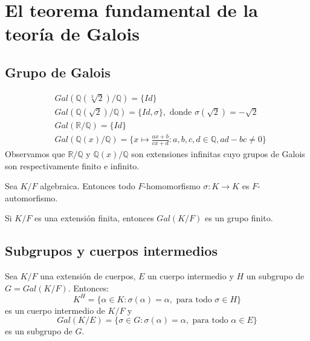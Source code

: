 \chapter{El teorema fundamental de la teoría de Galois}
\section{Grupo de Galois}

\begin{example}
    \begin{align*}
         & Gal(\mathbb{Q}(\sqrt[3]{2})/\mathbb{Q}) = \{Id\}                                                                \\
         & Gal(\mathbb{Q}(\sqrt{2})/\mathbb{Q}) = \{ Id, \sigma \}, \text{ donde } \sigma(\sqrt{2}) = -\sqrt{2}            \\
         & Gal(\mathbb{R}/\mathbb{Q}) = \{Id\}                                                                             \\
         & Gal(\mathbb{Q}(x)/\mathbb{Q}) = \{ x \mapsto \frac{ax + b}{cx + d} : a, b, c, d \in \mathbb{Q}, ad-bc \neq 0 \}
    \end{align*}
    Observamos que $\mathbb{R}/\mathbb{Q}$ y $\mathbb{Q}(x)/\mathbb{Q}$ son extensiones infinitas cuyo grupos de Galois son respectivamente finito e infinito.
\end{example}

\begin{lemma}
    Sea $K/F$ algebraica. Entonces todo $F$-homomorfismo $\sigma : K \to K$ es $F$-automorfismo.
\end{lemma}

\begin{theorem}
    Si $K/F$ es una extensión finita, entonces $Gal(K/F)$ es un grupo finito.
\end{theorem}

\section{Subgrupos y cuerpos intermedios}

\begin{theorem}
    Sea $K/F$ una extensión de cuerpos, $E$ un cuerpo intermedio y $H$ un subgrupo de $G = Gal(K/F)$. Entonces:
    $$K^H = \{ \alpha \in K : \sigma(\alpha) = \alpha, \text{ para todo } \sigma \in H \}$$
    es un cuerpo intermedio de $K/F$ y
    $$Gal(K/E) = \{ \sigma \in G : \sigma(\alpha) = \alpha, \text{ para todo } \alpha \in E \}$$
    es un subgrupo de $G$.
\end{theorem}

